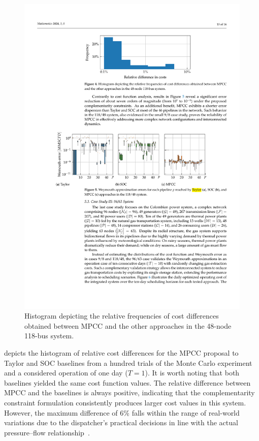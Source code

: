 \begin{figure}[h]
    \centering 
   \includegraphics[scale=0.85]{figures/Chapter_MPCC/g003.pdf}
    \caption{Histogram depicting the relative frequencies of cost differences obtained between MPCC and the other approaches in the 48-node 118-bus system.}
    \label{fig:green_test_cost}
\end{figure}



 depicts the histogram of relative cost differences for the MPCC proposal to Taylor and SOC baselines from a hundred trials of the Monte Carlo experiment and a considered operation of one day ($T=1$). It is worth noting that both baselines yielded the same cost function values. The relative difference between MPCC and the baselines is always positive, indicating that the complementarity constraint formulation consistently produces larger cost values in this system. However, the maximum difference of 6\% falls within the range of real-world variations due to the dispatcher's practical decisions in line with the actual pressure--flow relationship~\citep{ZHAO2023129010}. 

